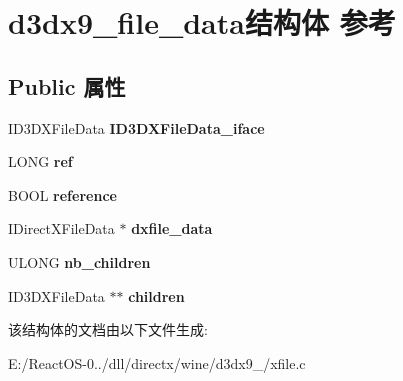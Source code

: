 \hypertarget{structd3dx9__file__data}{}\section{d3dx9\+\_\+file\+\_\+data结构体 参考}
\label{structd3dx9__file__data}
\subsection*{Public 属性}
\begin{DoxyCompactItemize}
\item 
\mbox{\label{structd3dx9__file__data_a5f8889bc39faf1b84be166aecb2ce462}} 
I\+D3\+D\+X\+File\+Data {\bfseries I\+D3\+D\+X\+File\+Data\+\_\+iface}
\item 
\mbox{\label{structd3dx9__file__data_a6600e193fc2c438b36ea34434433d964}} 
L\+O\+NG {\bfseries ref}
\item 
\mbox{\label{structd3dx9__file__data_ae2dcb20476f4423df136a4687957cd9d}} 
B\+O\+OL {\bfseries reference}
\item 
\mbox{\label{structd3dx9__file__data_accab0a192d98565c296968019713f716}} 
I\+Direct\+X\+File\+Data $\ast$ {\bfseries dxfile\+\_\+data}
\item 
\mbox{\label{structd3dx9__file__data_ac826bf1c39f6ee2263c252c1cfa667d7}} 
U\+L\+O\+NG {\bfseries nb\+\_\+children}
\item 
\mbox{\label{structd3dx9__file__data_a25d657ee8bafea31cc996dae43b26003}} 
I\+D3\+D\+X\+File\+Data $\ast$$\ast$ {\bfseries children}
\end{DoxyCompactItemize}


该结构体的文档由以下文件生成\+:\begin{DoxyCompactItemize}
\item 
E\+:/\+React\+O\+S-\/0../dll/directx/wine/d3dx9\+\_/xfile.\+c\end{DoxyCompactItemize}
